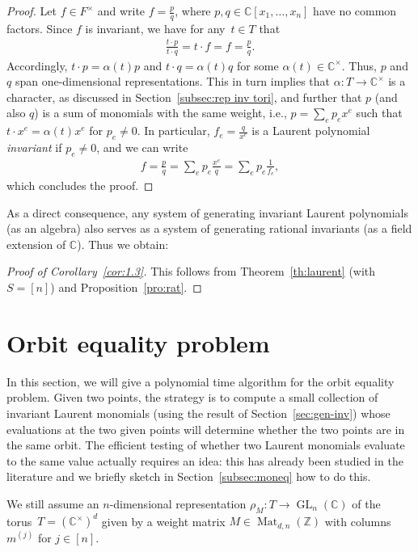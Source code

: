 \documentclass[10pt,a4paper]{article}
\DeclareMathOperator{\GL}{GL}
\DeclareMathOperator{\Mat}{Mat}
\theoremstyle{definition}
\numberwithin{equation}{section}
\newcommand{\CC}{\mathbb{C}}
\newcommand{\ZZ}{\mathbb{Z}}
\begin{document}
\begin{proof}
Let $f \in F^\times$ and write $f = \frac p q$, where $p,q \in \CC[x_1,\dots,x_n]$ have no common factors.
Since $f$ is invariant, we have for any~$t \in T$ that 
\begin{align*}
  \frac{t \cdot p}{t \cdot q} = t \cdot f = f = \frac pq.
\end{align*}
%
%
Accordingly, $t \cdot p = \alpha(t) p$ and $t \cdot q = \alpha(t) q$ for some $\alpha(t) \in \CC^\times$.
Thus, $p$ and $q$ span one-dimensional representations.
This in turn implies that $\alpha\colon T \to \CC^\times$ is a character, as discussed in Section~\ref{subsec:rep inv tori}, and further that $p$ (and also $q$) is a sum of monomials with the same weight, i.e., $p = \sum_e p_e x^e$ such that $t \cdot x^e = \alpha(t) x^e$ for $p_e\neq0$.
In particular, $f_e = \frac q {x^e}$ is a Laurent polynomial \emph{invariant} if $p_e\ne 0$, and we can write
\begin{align*}
  f
= \frac p q
= \sum_e p_e \frac{x^e}q
= \sum_e p_e \frac1{f_e},
\end{align*}
which concludes the proof.
\end{proof}

As a direct consequence, any system of generating invariant Laurent polynomials (as an algebra) also serves as a system of generating rational invariants (as a field extension of $\CC$).
Thus we obtain:

\begin{proof}[Proof of Corollary~\ref{cor:1.3}]
This follows from Theorem~\ref{th:laurent} (with $S=[n]$) and Proposition~\ref{pro:rat}.
\end{proof}

%
\section{Orbit equality problem}\label{sec:oe}
%
In this section, we will give a polynomial time algorithm for the orbit equality problem.
Given two points, the strategy is to compute a small collection of invariant Laurent monomials (using the result of Section~\ref{sec:gen-inv})
whose evaluations at the two given points will determine whether the two points are in the same orbit.
The efficient testing of whether two Laurent monomials evaluate to the same value actually requires an idea:
this has already been studied in the literature and we briefly sketch in Section~\ref{subsec:moneq} how to do this.

We still assume an $n$-dimensional representation $\rho_M \colon T \rightarrow \GL_n(\CC)$ of the torus~$T=(\CC^\times)^d$ given by a weight matrix $M \in \Mat_{d,n}(\ZZ)$ with columns $m^{(j)}$ for $j\in[n]$.
\end{document}
